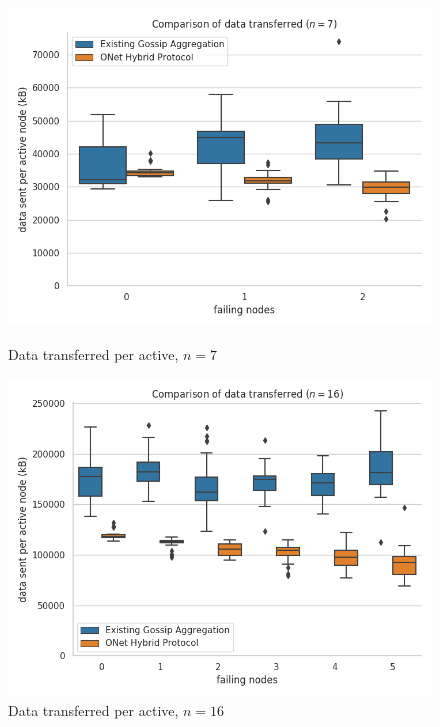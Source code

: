 \begin{figure}[H]
    \centering
    \begin{minipage}{0.5\textwidth}
        \centering
        \includegraphics[width=\textwidth]{images/bandwidth_tx_sum_7.png}
        \captionsetup{labelformat=empty}
        \caption{Data transferred per active, $n = 7$}
    \end{minipage}\hfill
    \begin{minipage}{0.5\textwidth}
        \centering
        \includegraphics[width=\textwidth]{images/bandwidth_tx_sum_16.png}
        \captionsetup{labelformat=empty}
        \caption{Data transferred per active, $n = 16$}
    \end{minipage}\hfill
\end{figure}

